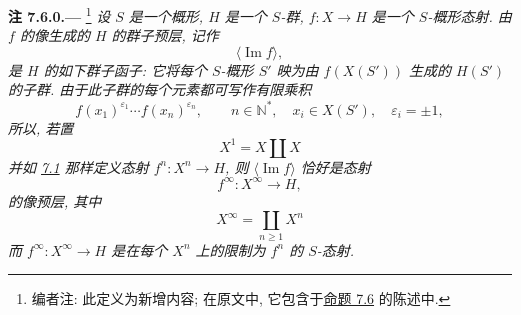 
\medskip
{}\label{rem:sga3-VIB-7.6.0}%
\noindent\textbf{注 7.6.0.---}%
\footnote{\label{note:sga3-VIB-76}编者注: 此定义为新增内容;
在原文中, 它包含于\hyperref[prop:sga3-VIB-7.6]{命题 7.6} 的陈述中.}
\emph{设 \(S\) 是一个概形, \(H\) 是一个 \(S\)-群,
\(f:X\to H\) 是一个 \(S\)-概形态射.
由 \(f\) 的像生成的 \(H\) 的群子预层, 记作}
\[
  \bigl\langle\operatorname{Im}f\bigr\rangle,
\]
\emph{是 \(H\) 的如下群子函子: 它将每个 \(S\)-概形 \(S'\)
映为由 \(f(X(S'))\) 生成的 \(H(S')\) 的子群.
由于此子群的每个元素都可写作有限乘积}
\label{form:sga3-VIB-7.6.0-finite-product}%
\[
  f(x_1)^{\varepsilon_1}\cdots f(x_n)^{\varepsilon_n},
  \qquad
  n\in\mathbb{N}^{*},\quad
  x_i\in X(S'),\quad
  \varepsilon_i=\pm1,
\]
\emph{所以, 若置}
\[
  X^1=X\amalg X
\]
\emph{并如 \hyperref[concl:sga3-VIB-7.1-ii]{7.1} 那样定义态射
\(f^n:X^n\to H\), 则 \(\langle\operatorname{Im}f\rangle\)
恰好是态射}
\label{form:sga3-VIB-7.6.0-finfty}%
\[
  f^\infty:X^\infty\longrightarrow H,
\]
\emph{的像预层, 其中}
\[
  X^\infty=\coprod_{n\geq1}X^n
\]
\emph{而 \(f^\infty:X^\infty\to H\) 是在每个 \(X^n\)
上的限制为 \(f^n\) 的 \(S\)-态射.}

